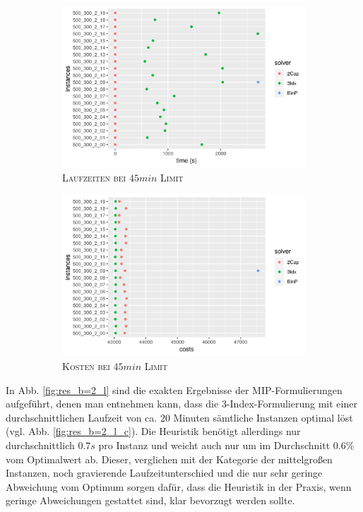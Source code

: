 \begin{figure}[H]
\centering
\begin{subfigure}[b]{0.4\textwidth}
\centering
\includegraphics[width=1.3\textwidth]{img/solver_instance_time_b=2_l_2700s.png}
\caption{\textsc{Laufzeiten bei $45min$ Limit}}
\label{fig:b=2_l_runtimes}
\end{subfigure}
\hfill
\begin{subfigure}[b]{0.4\textwidth}
\centering
\includegraphics[width=1.3\textwidth]{img/solver_instance_cost_b=2_l_2700s.png}
\caption{\textsc{Kosten bei $45min$ Limit}}
\label{fig:b=2_l_costs}
\end{subfigure}
\caption{}
\label{fig:res_plots_b=2_l}
\end{figure}

In Abb. \ref{fig:res_b=2_l} sind die exakten Ergebnisse der MIP-Formulierungen aufgeführt, denen man
entnehmen kann, dass die 3-Index-Formulierung mit einer durchschnittlichen Laufzeit von ca. $20$ Minuten sämtliche Instanzen
optimal löst (vgl. Abb. \ref{fig:res_b=2_l_c}). Die Heuristik benötigt allerdings nur durchschnittlich $0.7s$ pro Instanz und
weicht auch nur um im Durchschnitt $0.6 \%$ vom Optimalwert ab. Dieser, verglichen mit der Kategorie der mittelgroßen Instanzen,
noch gravierende Laufzeitunterschied und die nur sehr geringe Abweichung vom Optimum sorgen dafür, dass die Heuristik in der Praxis,
wenn geringe Abweichungen gestattet sind, klar bevorzugt werden sollte.


